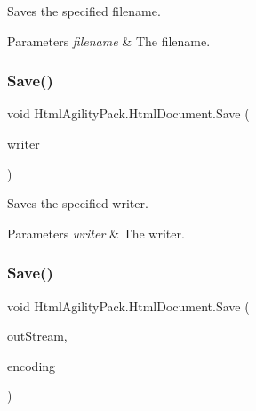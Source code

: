 Saves the specified filename. 


\begin{DoxyParams}{Parameters}
{\em filename} & The filename.\\
\hline
\end{DoxyParams}
\mbox{\label{class_html_agility_pack_1_1_html_document_a604211ba10c90bad128eb9787ad75939}} 
\subsubsection{\texorpdfstring{Save()}{Save()}\hspace{0.1cm}{\footnotesize\ttfamily [5/7]}}
{\footnotesize\ttfamily void Html\+Agility\+Pack.\+Html\+Document.\+Save (\begin{DoxyParamCaption}\item[{Xml\+Writer}]{writer }\end{DoxyParamCaption})\hspace{0.3cm}{\ttfamily [inline]}}



Saves the specified writer. 


\begin{DoxyParams}{Parameters}
{\em writer} & The writer.\\
\hline
\end{DoxyParams}
\mbox{\label{class_html_agility_pack_1_1_html_document_a15de9d07bec41ccc6cfc6d73595d290b}} 
\subsubsection{\texorpdfstring{Save()}{Save()}\hspace{0.1cm}{\footnotesize\ttfamily [6/7]}}
{\footnotesize\ttfamily void Html\+Agility\+Pack.\+Html\+Document.\+Save (\begin{DoxyParamCaption}\item[{Stream}]{out\+Stream,  }\item[{\hyperlink{class_html_agility_pack_1_1_html_document_a220bdf28a5e35f4898075084be2d59f0}{Encoding}}]{encoding }\end{DoxyParamCaption})\hspace{0.3cm}{\ttfamily [inline]}}



